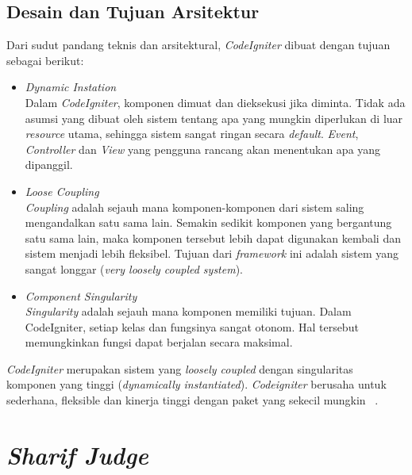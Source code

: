 \subsection{Desain dan Tujuan Arsitektur}
Dari sudut pandang teknis dan arsitektural, \textit{CodeIgniter} dibuat dengan tujuan sebagai berikut:
\begin{itemize}
	\item \textit{Dynamic Instation} \\
	Dalam \textit{CodeIgniter}, komponen dimuat dan dieksekusi jika diminta. Tidak ada asumsi yang dibuat oleh sistem tentang apa yang mungkin diperlukan di luar \textit{resource} utama, sehingga sistem sangat ringan secara \textit{default}. \textit{Event}, \textit{Controller} dan \textit{View} yang pengguna rancang akan menentukan apa yang dipanggil.
	\item \textit{Loose Coupling} \\
	\textit{Coupling} adalah sejauh mana komponen-komponen dari sistem saling mengandalkan satu sama lain. Semakin sedikit komponen yang bergantung satu sama lain, maka komponen tersebut lebih dapat digunakan kembali dan sistem menjadi lebih fleksibel. Tujuan dari \textit{framework} ini adalah sistem yang sangat longgar (\textit{very loosely coupled system}).
	\item \textit{Component Singularity} \\
	\textit{Singularity} adalah sejauh mana komponen memiliki tujuan. Dalam CodeIgniter, setiap kelas dan fungsinya sangat otonom. Hal tersebut memungkinkan fungsi dapat berjalan secara maksimal.
\end{itemize}

\textit{CodeIgniter} merupakan sistem yang \textit{loosely coupled} dengan singularitas komponen yang tinggi (\textit{dynamically instantiated}). \textit{Codeigniter} berusaha untuk sederhana, fleksible dan kinerja tinggi dengan paket yang sekecil mungkin ~\cite{bcit:17:cidoc}.

\section{\textit{Sharif Judge}}
\label{sec:sharifjudge} 

